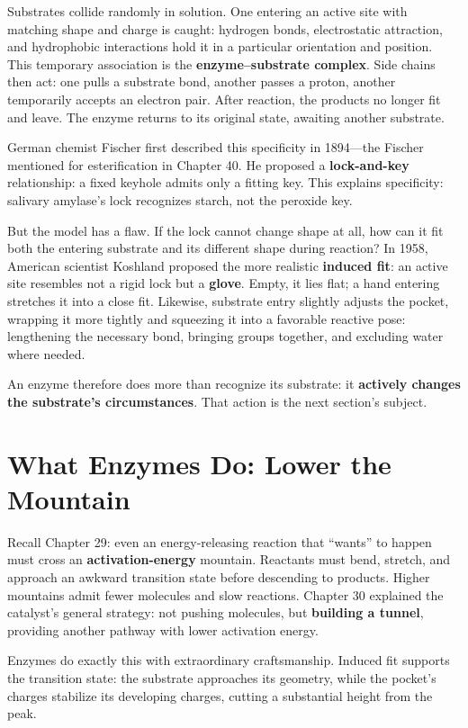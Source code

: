 Substrates collide randomly in solution. One entering an active site with matching shape and charge is caught: hydrogen bonds, electrostatic attraction, and hydrophobic interactions hold it in a particular orientation and position. This temporary association is the \textbf{enzyme--substrate complex}. Side chains then act: one pulls a substrate bond, another passes a proton, another temporarily accepts an electron pair. After reaction, the products no longer fit and leave. The enzyme returns to its original state, awaiting another substrate.

German chemist Fischer first described this specificity in 1894---the Fischer mentioned for esterification in Chapter 40. He proposed a \textbf{lock-and-key} relationship: a fixed keyhole admits only a fitting key. This explains specificity: salivary amylase's lock recognizes starch, not the peroxide key.

But the model has a flaw. If the lock cannot change shape at all, how can it fit both the entering substrate and its different shape during reaction? In 1958, American scientist Koshland proposed the more realistic \textbf{induced fit}: an active site resembles not a rigid lock but a \textbf{glove}. Empty, it lies flat; a hand entering stretches it into a close fit. Likewise, substrate entry slightly adjusts the pocket, wrapping it more tightly and squeezing it into a favorable reactive pose: lengthening the necessary bond, bringing groups together, and excluding water where needed.

An enzyme therefore does more than recognize its substrate: it \textbf{actively changes the substrate's circumstances}. That action is the next section's subject.

\section{What Enzymes Do: Lower the Mountain}

Recall Chapter 29: even an energy-releasing reaction that ``wants'' to happen must cross an \textbf{activation-energy} mountain. Reactants must bend, stretch, and approach an awkward transition state before descending to products. Higher mountains admit fewer molecules and slow reactions. Chapter 30 explained the catalyst's general strategy: not pushing molecules, but \textbf{building a tunnel}, providing another pathway with lower activation energy.

Enzymes do exactly this with extraordinary craftsmanship. Induced fit supports the transition state: the substrate approaches its geometry, while the pocket's charges stabilize its developing charges, cutting a substantial height from the peak.

